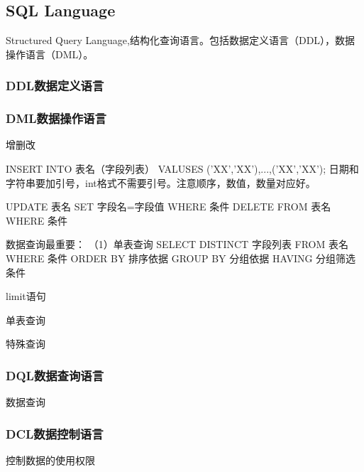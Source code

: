 \documentclass[UTF8]{../computerUniverse}
\begin{document}
    \subsection{SQL Language}
    Structured Query Language,结构化查询语言。包括数据定义语言（DDL），数据操作语言（DML）。
    
    \subsubsection{DDL数据定义语言}
        
        \begin{comment}
        CREATE TABLE 创建表
        DROP TABLE 删除表
        ALTER TABLE 修改表+( ADD 字段名 类型, MODIFY 字段名 新字段名 新字段类型, DROP 待删除字段, RENAME TO 表的新名字)
        TRUNCATE TABLE 清空表
        DESCRIBE 查看表结构
        建立主键、外键等约束(PRIMARY KEY, NOT NULL, UNIQUE, DEFAULT '男', AUTO_INCREMENT)
        UNIQUE 意思是不能有重复的。
        \end{comment}
    
    \subsubsection{DML数据操作语言}
    增删改
    
    INSERT INTO 表名（字段列表） VALUSES ('XX','XX'),...,('XX','XX'); 日期和字符串要加引号，int格式不需要引号。注意顺序，数值，数量对应好。
    
    UPDATE 表名 SET 字段名=字段值 WHERE 条件
    DELETE FROM 表名 WHERE 条件
    
    数据查询最重要：
    （1）单表查询
    SELECT DISTINCT 字段列表 FROM 表名 WHERE 条件
    ORDER BY 排序依据
    GROUP BY 分组依据
    HAVING 分组筛选条件
    
    limit语句
    
    单表查询
    
    特殊查询
    
    \subsubsection{DQL数据查询语言}
    数据查询
    
    \subsubsection{DCL数据控制语言}
    控制数据的使用权限
    
    
    
\end{document}
